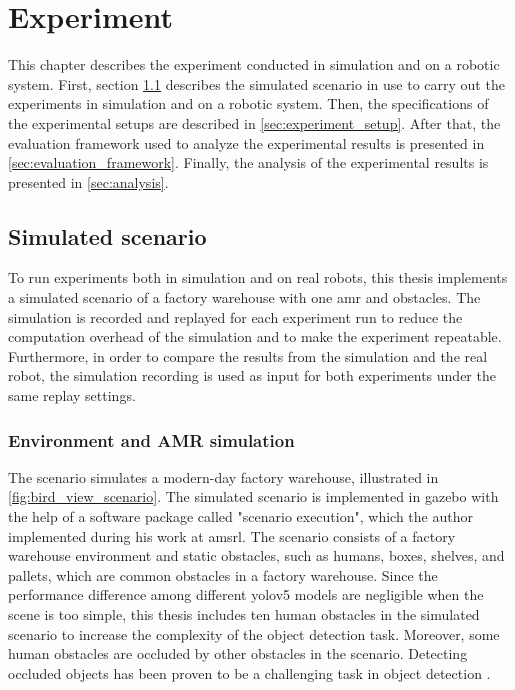 \chapter{Experiment}\label{ch:experiment}

This chapter describes the experiment conducted in simulation and on a robotic system. First, section \cref{sec:simulated_scenario} describes the simulated scenario in use to carry out the experiments in simulation and on a robotic system. Then, the specifications of the experimental setups are described in \cref{sec:experiment_setup}. After that, the evaluation framework used to analyze the experimental results is presented in \cref{sec:evaluation_framework}. Finally, the analysis of the experimental results is presented in \cref{sec:analysis}.

\section{Simulated scenario}\label{sec:simulated_scenario}

To run experiments both in simulation and on real robots, this thesis implements a simulated scenario of a factory warehouse with one \gls{amr} and obstacles. The simulation is recorded and replayed for each experiment run to reduce the computation overhead of the simulation and to make the experiment repeatable. Furthermore, in order to compare the results from the simulation and the real robot, the simulation recording is used as input for both experiments under the same replay settings. 

\subsection{Environment and AMR simulation}

The scenario simulates a modern-day factory warehouse, illustrated in \cref{fig:bird_view_scenario}. The simulated scenario is implemented in \gls{gazebo} with the help of a software package called "scenario execution", which the author implemented during his work at \gls{amsrl}. The scenario consists of a factory warehouse environment and static obstacles, such as humans, boxes, shelves, and pallets, which are common obstacles in a factory warehouse. Since the performance difference among different \gls{yolo}v5 models are negligible when the scene is too simple, this thesis includes ten human obstacles in the simulated scenario to increase the complexity of the object detection task. Moreover, some human obstacles are occluded by other obstacles in the scenario. Detecting occluded objects has been proven to be a challenging task in object detection \cite{Saleh2021}. 

